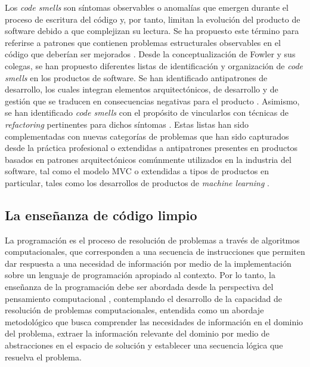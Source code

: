 \documentclass[spanish]{textolivre}
\begin{document}
Los \textit{code smells} son síntomas observables o anomalías que emergen durante el proceso de escritura del código y, por tanto, limitan la evolución del producto de software debido a que complejizan su lectura. Se ha propuesto este término para referirse a patrones que contienen problemas estructurales observables en el código que deberían ser mejorados \cite{fowler2018refactoring}. Desde la conceptualización de Fowler y sus colegas, se han propuesto diferentes listas de identificación y organización de \textit{code smells} en los productos de software. Se han identificado antipatrones de desarrollo, los cuales integran elementos arquitectónicos, de desarrollo y de gestión que se traducen en consecuencias negativas para el producto \cite{brown1998architectures}. Asimismo, se han identificado \textit{code smells} con el propósito de vincularlos con técnicas de \textit{refactoring} pertinentes para dichos síntomas \cite{fowler2018refactoring, lacerda2020code}. Estas listas han sido complementadas con nuevas categorías de problemas que han sido capturados desde la práctica profesional \cite{gupta2016modelling} o extendidas a antipatrones presentes en productos basados en patrones arquitectónicos comúnmente utilizados en la industria del software, tal como el modelo MVC \cite{aniche2018code} o extendidas a tipos de productos en particular, tales como los desarrollos de productos de \textit{machine learning} \cite{van2021prevalence, liu2019deep}. 

\subsection{La enseñanza de código limpio}
La programación es el proceso de resolución de problemas a través de algoritmos computacionales, que corresponden a una secuencia de instrucciones que permiten dar respuesta a una necesidad de información por medio de la implementación sobre un lenguaje de programación apropiado al contexto. Por lo tanto, la enseñanza de la programación debe ser abordada desde la perspectiva del pensamiento computacional \cite{wing2008computational, voogt2015computational}, contemplando el desarrollo de la capacidad de resolución de problemas computacionales, entendida como un abordaje metodológico que busca comprender las necesidades de información en el dominio del problema, extraer la información relevante del dominio por medio de abstracciones en el espacio de solución y establecer una secuencia lógica que resuelva el problema. 
\end{document}
